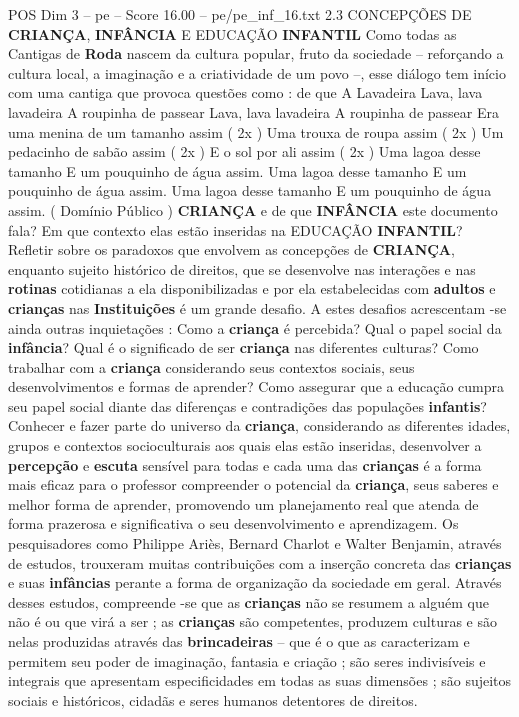 \begin{textsample}{POS Dim 3 – pe – Score 16.00 – pe/pe\_inf\_16.txt}  \label{ex:f3_pos_275}
2.3 CONCEPÇÕES DE \textbf{CRIANÇA}, \textbf{INFÂNCIA} E EDUCAÇÃO \textbf{INFANTIL} Como todas as Cantigas de \textbf{Roda} nascem da cultura popular, fruto da sociedade – reforçando a cultura local, a imaginação e a criatividade de um povo –, esse diálogo tem início com uma cantiga que provoca questões como : de que A Lavadeira Lava, lava lavadeira A roupinha de passear Lava, lava lavadeira A roupinha de passear Era uma menina de um tamanho assim ( 2x ) Uma trouxa de roupa assim ( 2x ) Um pedacinho de sabão assim ( 2x ) E o sol por ali assim ( 2x ) Uma lagoa desse tamanho E um pouquinho de água assim.
Uma lagoa desse tamanho E um pouquinho de água assim.
Uma lagoa desse tamanho E um pouquinho de água assim. ( Domínio Público ) \textbf{CRIANÇA} e de que \textbf{INFÂNCIA} este documento fala?
Em que contexto elas estão inseridas na EDUCAÇÃO \textbf{INFANTIL}?
Refletir sobre os paradoxos que envolvem as concepções de \textbf{CRIANÇA}, enquanto sujeito histórico de direitos, que se desenvolve nas interações e nas \textbf{rotinas} cotidianas a ela disponibilizadas e por ela estabelecidas com \textbf{adultos} e \textbf{crianças} nas \textbf{Instituições} é um grande desafio.
A estes desafios acrescentam -se ainda outras inquietações : Como a \textbf{criança} é percebida?
Qual o papel social da \textbf{infância}?
Qual é o significado de ser \textbf{criança} nas diferentes culturas?
Como trabalhar com a \textbf{criança} considerando seus contextos sociais, seus desenvolvimentos e formas de aprender?
Como assegurar que a educação cumpra seu papel social diante das diferenças e contradições das populações \textbf{infantis}?
Conhecer e fazer parte do universo da \textbf{criança}, considerando as diferentes idades, grupos e contextos socioculturais aos quais elas estão inseridas, desenvolver a \textbf{percepção} e \textbf{escuta} sensível para todas e cada uma das \textbf{crianças} é a forma mais eficaz para o professor compreender o potencial da \textbf{criança}, seus saberes e melhor forma de aprender, promovendo um planejamento real que atenda de forma prazerosa e significativa o seu desenvolvimento e aprendizagem.
Os pesquisadores como Philippe Ariès, Bernard Charlot e Walter Benjamin, através de estudos, trouxeram muitas contribuições com a inserção concreta das \textbf{crianças} e suas \textbf{infâncias} perante a forma de organização da sociedade em geral.
Através desses estudos, compreende -se que as \textbf{crianças} não se resumem a alguém que não é ou que virá a ser ; as \textbf{crianças} são competentes, produzem culturas e são nelas produzidas através das \textbf{brincadeiras} – que é o que as caracterizam e permitem seu poder de imaginação, fantasia e criação ; são seres indivisíveis e integrais que apresentam especificidades em todas as suas dimensões ; são sujeitos sociais e históricos, cidadãs e seres humanos detentores de direitos.

\end{textsample}
